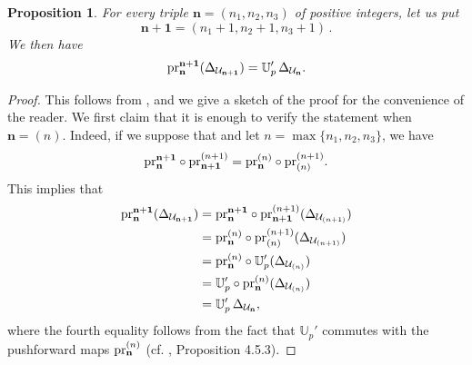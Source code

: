 \documentclass{amsart}
\numberwithin{equation}{section}
\newtheorem{proposition}[theorem]{Proposition}
\begin{document}
\begin{proposition}\label{prop:norm_comp_indefinite}
 For every triple ${\mathbf{n} } = (n_1, n_2, n_3)$ of positive integers, let us put 
 $$\mathbf{n}+\mathbf{1} =  (n_1 +1 , n_2 +1, n_3+1)\,.$$
 We then have 
 \[ {\rm pr}^{\mathbf{n}+\mathbf{1}}_{\mathbf{n}}(\Delta_{\mathcal{U}_{\mathbf{n+1}}}) = \mathbb{U}_p' \, \Delta_{\mathcal{U}_{\mathbf{n}}}.\] 
\end{proposition}
\begin{proof}
   This follows from \cite[Proposition 4.5.2]{LoefflerSpherical}, and we give a sketch of the proof for the convenience of the reader. We first claim that it is enough to verify the statement when ${\mathbf{n} } = (n)$. Indeed, if we suppose that and let $n = \max\{ n_1,n_2,n_3 \}$, we have $$ {\rm pr}^{\mathbf{n}+\mathbf{1}}_{\mathbf{n}} \circ {\rm pr}^{(n + 1)}_{\mathbf{n}+\mathbf{1}} =  {\rm pr}^{(n)}_{\mathbf{n}} \circ {\rm pr}^{(n + 1)}_{(n)}.$$  This implies that
 \begin{align*}
 {\rm pr}^{\mathbf{n}+\mathbf{1}}_{\mathbf{n}}(\Delta_{\mathcal{U}_{\mathbf{n+1}}}) &=  {\rm pr}^{\mathbf{n}+\mathbf{1}}_{\mathbf{n}} \circ {\rm pr}^{(n + 1)}_{\mathbf{n}+\mathbf{1}}(\Delta_{\mathcal{U}_{(n+1)}})   \\ &=  {\rm pr}^{(n)}_{\mathbf{n}} \circ {\rm pr}^{(n + 1)}_{(n)}(\Delta_{\mathcal{U}_{(n+1)}}) \\ &=  {\rm pr}^{(n)}_{\mathbf{n}} \circ \mathbb{U}_p' ( \Delta_{\mathcal{U}_{(n)}} ) \\ 
 &= \mathbb{U}_p' \circ {\rm pr}^{(n)}_{\mathbf{n}}  ( \Delta_{\mathcal{U}_{(n)}} )\\
  &= \mathbb{U}_p' \,  \Delta_{\mathcal{U}_{\mathbf{n}}}, 
 \end{align*} 
  where the fourth equality follows from the fact that  $\mathbb{U}_p' $ commutes with the pushforward maps ${\rm pr}^{(n)}_{\mathbf{n}}$ (cf. \cite{LoefflerSpherical}, Proposition 4.5.3). 
  


\end{proof}
\end{document}
